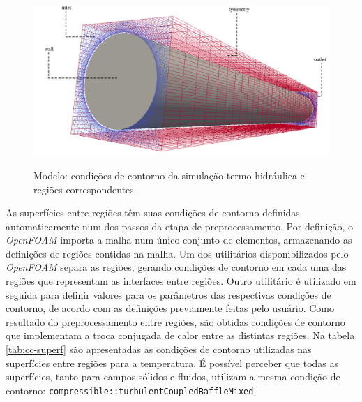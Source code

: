 \begin{figure}[htb]
  \caption{Modelo: condições de contorno da simulação termo-hidráulica e regiões
    correspondentes.}
  \centering\includegraphics[scale=0.5]{figuras/inlet_paredes_extremos_wireframe2.png}
  \label{fig:ccth}
\end{figure}

As superfícies entre regiões têm suas condições de contorno definidas automaticamente
num dos passos da etapa de preprocessamento. Por definição, o \textit{OpenFOAM} importa
a malha num único conjunto de elementos, armazenando as definições de regiões
contidas na malha. Um dos utilitários disponibilizados pelo \textit{OpenFOAM} separa
as regiões, gerando condições de contorno em cada uma das regiões que representam
as interfaces entre regiões. Outro utilitário é utilizado em seguida para definir valores
para os parâmetros das respectivas condições de contorno, de acordo com as definições
previamente feitas pelo usuário. Como resultado do preprocessamento
entre regiões, são obtidas condições de contorno que implementam a troca
conjugada de calor entre as distintas regiões. Na tabela \ref{tab:cc-superf} são
apresentadas as condições de contorno utilizadas nas superfícies entre regiões para a temperatura.
É possível perceber que todas as superfícies,
tanto para campos sólidos e fluidos, utilizam a mesma condição de contorno:
\texttt{compressible::turbulentCoupledBaffleMixed}.


